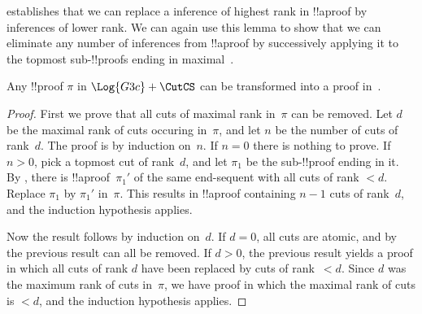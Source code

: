 \documentclass[../../../include/open-logic-section]{subfiles}
\begin{document}
 establishes that we can replace a \CutCS{}
inference of highest rank in !!a{proof} by \CutCS{} inferences of
lower rank. We can again use this lemma to show that we can eliminate
any number of \CutCS{} inferences from !!a{proof} by successively
applying it to the topmost sub-!!{proof}s ending in maximal~\CutCS.

\begin{thm}
Any !!{proof} $\pi$ in $\Log{G3c} + \CutCS$ can be transformed into a proof in~.
\end{thm}

\begin{proof}
  First we prove that all cuts of maximal rank in~$\pi$ can be
  removed. Let $d$ be the maximal rank of cuts occuring in~$\pi$, and
  let $n$ be the number of cuts of rank~$d$. The proof is by induction
  on~$n$. If $n=0$ there is nothing to prove. If $n>0$, pick a topmost
  cut of rank~$d$, and let $\pi_1$ be the sub-!!{proof} ending in it.
  By , there is !!a{proof}~$\pi_1'$ of the
  same end-sequent with all cuts of rank $<d$. Replace $\pi_1$ by
  $\pi_1'$ in~$\pi$. This results in !!a{proof} containing $n-1$ cuts
  of rank~$d$, and the induction hypothesis applies.

  Now the result follows by induction on~$d$. If $d=0$, all cuts are
  atomic, and by the previous result can all be removed. If $d>0$,
  the previous result yields a proof in which all cuts of rank $d$
  have been replaced by cuts of rank~$<d$. Since $d$ was the maximum
  rank of cuts in~$\pi$, we have proof in which the maximal rank of
  cuts is $<d$, and the induction hypothesis applies.
\end{proof}
\end{document}
